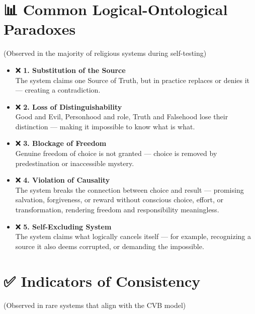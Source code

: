 \documentclass[12pt]{article}
\begin{document}
\section*{📊 Common Logical-Ontological Paradoxes}

(Observed in the majority of religious systems during self-testing)

\begin{itemize}
\item ❌ \textbf{1. Substitution of the Source}\\
The system claims one Source of Truth, but in practice replaces or denies it — creating a contradiction.

\item ❌ \textbf{2. Loss of Distinguishability}\\
Good and Evil, Personhood and role, Truth and Falsehood lose their distinction — making it impossible to know what is what.

\item ❌ \textbf{3. Blockage of Freedom}\\
Genuine freedom of choice is not granted — choice is removed by predestination or inaccessible mystery.

\item ❌ \textbf{4. Violation of Causality}\\
The system breaks the connection between choice and result — promising salvation, forgiveness, or reward without conscious choice, effort, or transformation, rendering freedom and responsibility meaningless.

\item ❌ \textbf{5. Self-Excluding System}\\
The system claims what logically cancels itself — for example, recognizing a source it also deems corrupted, or demanding the impossible.
\end{itemize}

\section*{✅ Indicators of Consistency}

(Observed in rare systems that align with the CVB model)
\end{document}

